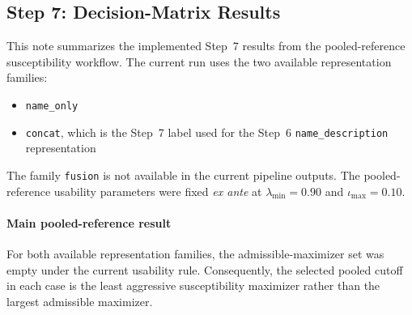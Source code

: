 \subsection{Step 7: Decision-Matrix Results}
\label{sec:step7_decision_matrix_results}

This note summarizes the implemented Step~7 results from the pooled-reference susceptibility workflow. The current run uses the two available representation families:
\begin{itemize}
    \item \texttt{name\_only}
    \item \texttt{concat}, which is the Step~7 label used for the Step~6 \texttt{name\_description} representation
\end{itemize}

The family \texttt{fusion} is not available in the current pipeline outputs. The pooled-reference usability parameters were fixed \emph{ex ante} at $\lambda_{\min}=0.90$ and $\iota_{\max}=0.10$.

\paragraph{Main pooled-reference result}
For both available representation families, the admissible-maximizer set was empty under the current usability rule. Consequently, the selected pooled cutoff in each case is the least aggressive susceptibility maximizer rather than the largest admissible maximizer.

\begin{table}[htbp]
\centering
\small
\setlength{\tabcolsep}{4pt}
\caption{Pooled-reference Step~7 decision matrix for the all-tracks graph}
\end{table}

